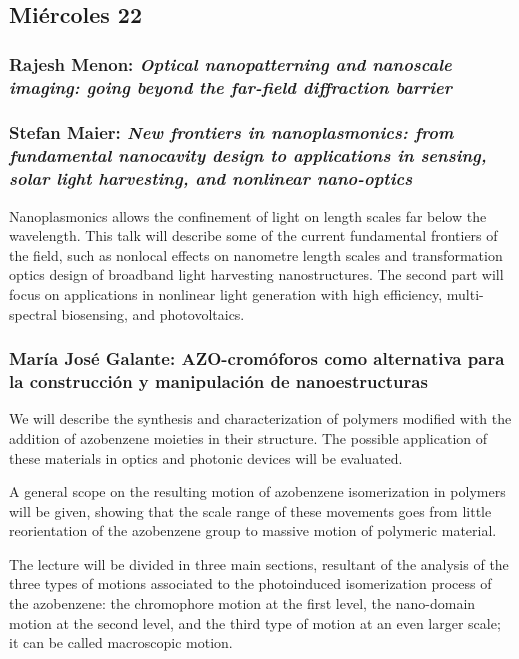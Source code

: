 \subsection*{Mi\'ercoles 22}

\subsubsection*{Rajesh Menon: \textit{Optical nanopatterning and nanoscale
imaging: going beyond the far-field diffraction barrier}}

\subsubsection*{Stefan Maier: \textit{New frontiers in nanoplasmonics: from
fundamental nanocavity design to applications in sensing, solar light
harvesting, and nonlinear nano-optics}}

Nanoplasmonics allows the confinement of light on length scales far below the
wavelength. This talk will describe some of the current fundamental frontiers of
the field, such as nonlocal effects on nanometre length scales and
transformation optics design of broadband light harvesting nanostructures. The
second part will focus on applications in nonlinear light generation with high
efficiency, multi-spectral biosensing, and photovoltaics.

\subsubsection*{Mar\'ia Jos\'e Galante: AZO-crom\'oforos como alternativa para
la construcci\'on y manipulaci\'on de nanoestructuras}

We will describe the synthesis and characterization of polymers modified with
the addition of azobenzene moieties in their structure. The possible application
of these materials in optics and photonic devices will be evaluated.

A general scope on the resulting motion of azobenzene isomerization in polymers
will be given, showing that the scale range of these movements goes from little
reorientation of the azobenzene group to massive motion of polymeric material.

The lecture will be divided in three main sections, resultant of the analysis of
the three types of motions associated to the photoinduced isomerization process
of the azobenzene: the chromophore motion at the first level, the nano-domain
motion at the second level, and the third type of motion at an even larger
scale; it can be called macroscopic motion.

